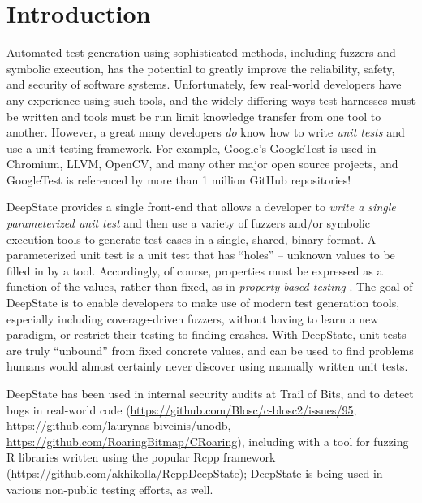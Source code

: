 \documentclass[sigconf]{acmart}
\begin{document}



\maketitle

\section{Introduction}

Automated test generation using sophisticated methods, including fuzzers and symbolic execution, has the potential to greatly improve the reliability, safety, and security of software systems.  Unfortunately, few real-world developers have any experience using such tools, and the widely differing ways test harnesses must be written \cite{WODACommon} and tools must be run limit knowledge transfer from one tool to another.  However, a great many developers \emph{do} know how to write \emph{unit tests} and use a unit testing framework.  For example, Google's GoogleTest is used in Chromium, LLVM, OpenCV, and many other major open source projects, and GoogleTest is referenced by more than 1 million GitHub repositories!

DeepState \cite{goodman2018deepstate} provides a single front-end that allows a developer to \emph{write a single parameterized unit test} \cite{ParamUnit}  and then use a variety of fuzzers and/or symbolic execution tools to generate test cases in a single, shared, binary format.  A parameterized unit test is a unit test that has ``holes'' -- unknown values to be filled in by a tool.  Accordingly, of course, properties must be expressed as a function of the values, rather than fixed, as in \emph{property-based testing} \cite{ClaessenH00}.  The goal of DeepState is to enable developers to make use of modern test generation tools, especially including coverage-driven fuzzers, without having to learn a new paradigm, or restrict their testing to finding crashes.  With DeepState, unit tests are truly ``unbound'' from fixed concrete values, and can be used to find problems humans would almost certainly never discover using manually written unit tests.

DeepState has been used in internal security audits at Trail of Bits, and to detect bugs in real-world code (\url{https://github.com/Blosc/c-blosc2/issues/95}, \url{https://github.com/laurynas-biveinis/unodb}, \url{https://github.com/RoaringBitmap/CRoaring}), including with a tool for fuzzing R libraries written using the popular Rcpp framework (\url{https://github.com/akhikolla/RcppDeepState}); DeepState is being used in various non-public testing efforts, as well.
\end{document}

